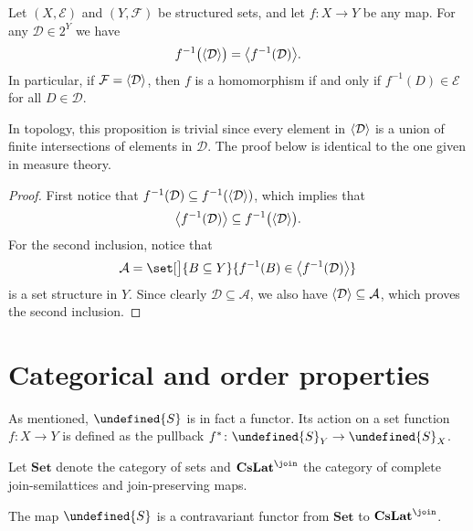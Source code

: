 \documentclass[article, a4paper, 11pt, oneside]{memoir}
\let\mathfrak\undefined
\numberwithin{equation}{chapter}
\newcommand{\calE}{\mathcal{E}}
\newcommand{\calD}{\mathcal{D}}
\newcommand{\calF}{\mathcal{F}}
\newcommand{\calA}{\mathcal{A}}
\newcommand{\strucS}{\mathfrak{S}}
\DeclarePairedDelimiter{\gen}{\langle}{\rangle} %
\newcommand{\ncat}[1]{\mathbf{#1}} %
\newcommand{\catSet}{\ncat{Set}} %
\newcommand{\catCJoinLat}{\ncat{CsLat}^{\join}} %
\begin{document}
\begin{proposition}
    \label{thm:preimage_and_generation_commute}
    Let $(X,\calE)$ and $(Y,\calF)$ be structured sets, and let $f \colon X \to Y$ be any map. For any $\calD \in 2^Y$ we have
    \begin{equation*}
        f^{-1}\bigl( \gen{\calD} \bigr) = \gen[\big]{f^{-1}(\calD)}.
    \end{equation*}
    In particular, if $\calF = \gen{\calD}$, then $f$ is a homomorphism if and only if $f^{-1}(D) \in \calE$ for all $D \in \calD$.
\end{proposition}
%
In topology, this proposition is trivial since every element in $\gen{\calD}$ is a union of finite intersections of elements in $\calD$. The proof below is identical to the one given in measure theory.

\begin{proof}
    First notice that $f^{-1}(\calD) \subseteq f^{-1}(\gen{\calD})$, which implies that
    \begin{equation*}
        \gen[\big]{f^{-1}(\calD)} \subseteq f^{-1}\bigl( \gen{\calD} \bigr).
    \end{equation*}
    For the second inclusion, notice that
    \begin{equation*}
        \calA = \set[\big]{B \subseteq Y}{f^{-1}(B) \in \gen[\big]{f^{-1}(\calD)}}
    \end{equation*}
    is a set structure in $Y$. Since clearly $\calD \subseteq \calA$, we also have $\gen{\calD} \subseteq \calA$, which proves the second inclusion.
\end{proof}


\section{Categorical and order properties} \label{sec:structure_categorical}

As mentioned, $\strucS$ is in fact a functor. Its action on a set function $f \colon X \to Y$ is defined as the pullback $f^* \colon \strucS_Y \to \strucS_X$.

Let $\catSet$ denote the category of sets and $\catCJoinLat$ the category of complete join-semilattices and join-preserving maps.

\begin{proposition}[Functoriality of $\strucS$, I]
    The map $\strucS$ is a contravariant functor from $\catSet$ to $\catCJoinLat$.
\end{proposition}
\end{document}
